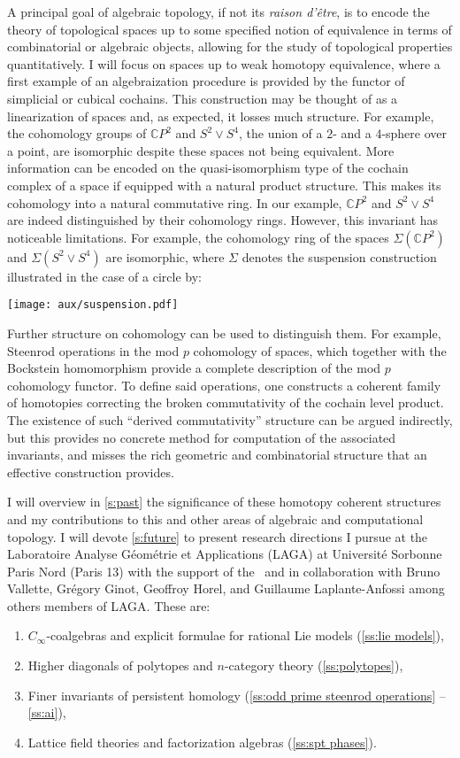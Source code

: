 A principal goal of algebraic topology, if not its \emph{raison d'\^{e}tre}, is to encode the theory of topological spaces up to some specified notion of equivalence in terms of combinatorial or algebraic objects, allowing for the study of topological properties quantitatively.
I will focus on spaces up to weak homotopy equivalence, where a first example of an algebraization procedure is provided by the functor of simplicial or cubical cochains.
This construction may be thought of as a linearization of spaces and, as expected, it losses much structure.
For example, the cohomology groups of $\mathbb{C} P^2$ and $S^2 \vee S^4$, the union of a $2$- and a $4$-sphere over a point, are isomorphic despite these spaces not being equivalent.
More information can be encoded on the quasi-isomorphism type of the cochain complex of a space if equipped with a natural product structure.
This makes its cohomology into a natural commutative ring.
In our example, $\mathbb{C} P^2$ and $S^2 \vee S^4$ are indeed distinguished by their cohomology rings.
However, this invariant has noticeable limitations.
For example, the cohomology ring of the spaces $\Sigma(\mathbb{C} P^2)$ and $\Sigma(S^2 \vee S^4)$ are isomorphic, where $\Sigma$ denotes the suspension construction illustrated in the case of a circle by:
\begin{center}
	\texttt{[image: aux/suspension.pdf]}
\end{center}
Further structure on cohomology can be used to distinguish them.
For example, Steenrod operations in the mod $p$ cohomology of spaces, which together with the Bockstein homomorphism provide a complete description of the mod $p$ cohomology functor.
To define said operations, one constructs a coherent family of homotopies correcting the broken commutativity of the cochain level product.
The existence of such ``derived commutativity'' structure can be argued indirectly, but this provides no concrete method for computation of the associated invariants, and misses the rich geometric and combinatorial structure that an effective construction provides.

I will overview in \cref{s:past} the significance of these homotopy coherent structures and my contributions to this and other areas of algebraic and computational topology.
I will devote \cref{s:future} to present research directions I pursue at the Laboratoire Analyse G\'eom\'etrie et Applications (LAGA) at Universit\'e Sorbonne Paris Nord (Paris 13) with the support of the \grantName\ and in collaboration with Bruno Vallette, Gr\'egory Ginot, Geoffroy Horel, and Guillaume Laplante-Anfossi among others members of LAGA.
These are:

\begin{enumerate}
	\item $C_\infty$-coalgebras and explicit formulae for rational Lie models (\cref{ss:lie models}),
	\item Higher diagonals of polytopes and $n$-category theory (\cref{ss:polytopes}),
	\item Finer invariants of persistent homology (\cref{ss:odd prime steenrod operations} -- \cref{ss:ai}),
	\item Lattice field theories and factorization algebras (\cref{ss:spt phases}).
\end{enumerate}
